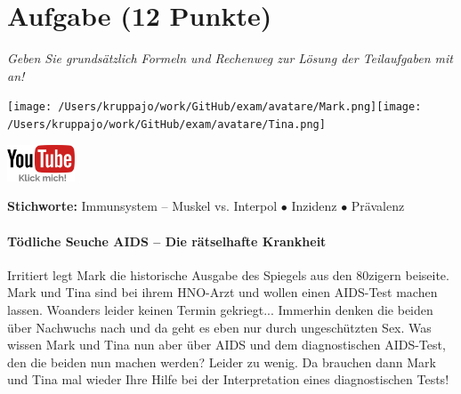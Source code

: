 \documentclass[a4paper, 9pt]{scrartcl}\usepackage[]{graphicx}\usepackage[]{xcolor}
\begin{document}
 
\clearpage

\section{Aufgabe \hfill (12 Punkte)}

\textit{Geben Sie grundsätzlich Formeln und Rechenweg zur Lösung der Teilaufgaben mit an!} \\[1Ex]
 

 
\ifcollection
\begin{flushright}
\tiny\vspace{-3Ex}
\textbf{\examinhaltstart}
\exammodulemathstat
\vspace{-4Ex}
\end{flushright}
\begin{minipage}[t]{0.5\textwidth}
\texttt{[image: /Users/kruppajo/work/GitHub/exam/avatare/Mark.png]}\hspace{-4mm}\texttt{[image: /Users/kruppajo/work/GitHub/exam/avatare/Tina.png]}
\end{minipage}
\begin{minipage}[t]{0.5\textwidth}
\hfill
\href{https://youtu.be/flRBo1FWQy0}{\includegraphics[width = 2cm]{img/youtube}}
\end{minipage}
\fi

{\tiny\textbf{Stichworte:} Immunsystem -- Muskel vs. Interpol $\bullet$ Inzidenz $\bullet$ Prävalenz}




\ifcollection
\paragraph{Tödliche Seuche AIDS -- Die rätselhafte Krankheit}
\fi



Irritiert legt Mark die historische Ausgabe des Spiegels aus den 80zigern beiseite. Mark und Tina sind bei ihrem HNO-Arzt und wollen einen AIDS-Test machen lassen. Woanders leider keinen Termin gekriegt... Immerhin denken die beiden über Nachwuchs nach und da geht es eben nur durch ungeschützten Sex. Was wissen Mark und Tina nun aber über AIDS und dem diagnostischen AIDS-Test, den die beiden nun machen werden? Leider zu wenig. Da brauchen dann Mark und Tina mal wieder Ihre Hilfe bei der Interpretation eines diagnostischen Tests!\\
\end{document}
